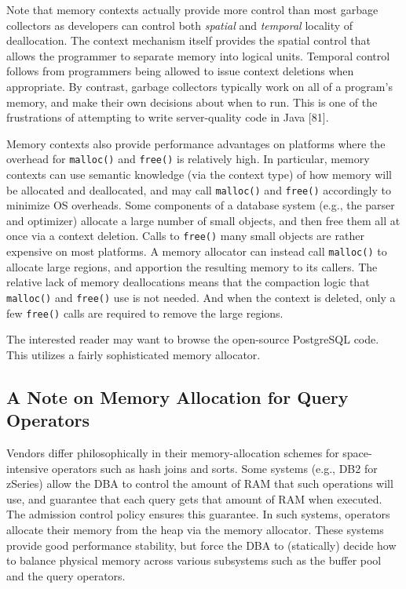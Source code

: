 \documentclass[b5paper,11pt,twoside,openright]{book}
\begin{document}
Note that memory contexts actually provide more control than most
garbage collectors as developers can control both \emph{spatial} and
\emph{temporal} locality of deallocation. The context mechanism itself
provides the spatial control that allows the programmer to separate
memory into logical units. Temporal control follows from programmers
being allowed to issue context deletions when appropriate. By contrast,
garbage collectors typically work on all of a program's memory, and
make their own decisions about when to run. This is one of the
frustrations of attempting to write server-quality code in Java
{[}81{]}.

Memory contexts also provide performance advantages on platforms where
the overhead for \texttt{malloc()} and \texttt{free()} is relatively high. In particular,
memory contexts can use semantic knowledge (via the context type) of how
memory will be allocated and deallocated, and may call \texttt{malloc()} and
\texttt{free()} accordingly to minimize OS overheads. Some components of a
database system (e.g., the parser and optimizer) allocate a large number
of small objects, and then free them all at once via a context deletion.
Calls to \texttt{free()} many small objects are rather expensive on most
platforms. A memory allocator can instead call \texttt{malloc()} to allocate
large regions, and apportion the resulting memory to its callers. The
relative lack of memory deallocations means that the compaction logic
that \texttt{malloc()} and \texttt{free()} use is not needed. And when the context is
deleted, only a few \texttt{free()} calls are required to remove the large
regions.

The interested reader may want to browse the open-source PostgreSQL
code. This utilizes a fairly sophisticated memory allocator.

\hypertarget{a-note-on-memory-allocation-for-query-operators}{%
\subsection{A Note on Memory Allocation for Query
Operators}\label{a-note-on-memory-allocation-for-query-operators}}

Vendors differ philosophically in their memory-allocation schemes for
space-intensive operators such as hash joins and sorts. Some systems
(e.g., DB2 for zSeries) allow the DBA to control the amount of RAM that
such operations will use, and guarantee that each query gets that amount
of RAM when executed. The admission control policy ensures this
guarantee. In such systems, operators allocate their memory from the
heap via the memory allocator. These systems provide good performance
stability, but force the DBA to (statically) decide how to balance
physical memory across various subsystems such as the buffer pool and
the query operators.
\end{document}
